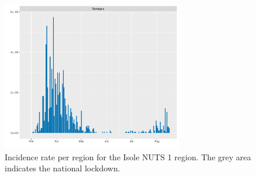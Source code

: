 \documentclass[12pt]{article}
\begin{document}
\begin{appendices}
    	\begin{figure}[H]
    	    \centering
    	    \includegraphics[width=0.7\textwidth]{output/infective_rates_Isole.pdf}
    	    \caption{Incidence rate per region for the Isole NUTS 1 region. The grey area indicates the national lockdown.}
    	    \label{fig:incidence_isole}
    	\end{figure}
		
		
		
    	
		

\end{appendices}
\end{document}
